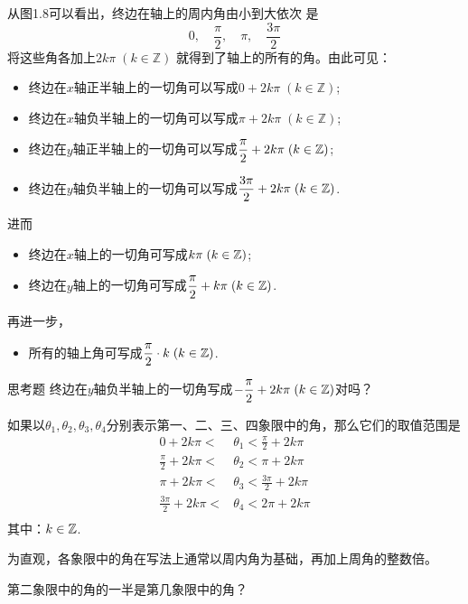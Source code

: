 从图1.8可以看出，终边在轴上的周内角由小到大依次
是
\[0,\quad  \frac{\pi}{2},\quad \pi,\quad \frac{3\pi}{2}\]
将这些角各加上$2k\pi\; (k\in\mathbb{Z})$ 就得到了轴上的所有的角。由此可见：
\begin{itemize}
    \item 终边在$x$轴正半轴上的一切角可以写成$0+2k\pi\; (k\in\mathbb{Z})$;
    \item 终边在$x$轴负半轴上的一切角可以写成$\pi+2k\pi\; (k\in\mathbb{Z})$;
    \item 终边在$y$轴正半轴上的一切角可以写成$\dfrac{\pi}{2}+2k\pi\; (k\in \mathbb{Z})$; 
    \item 终边在$y$轴负半轴上的一切角可以写成$\dfrac{3\pi}{2}+2k\pi\; (k\in \mathbb{Z})$.
\end{itemize}
进而
\begin{itemize}
    \item 终边在$x$轴上的一切角可写成$k\pi\; (k\in \mathbb{Z})$;
    \item 终边在$y$轴上的一切角可写成$\dfrac{\pi}{2}+k\pi\; (k\in \mathbb{Z})$.
\end{itemize}
再进一步，
\begin{itemize}
    \item 所有的轴上角可写成$\dfrac{\pi}{2}\cdot k\; (k\in \mathbb{Z})$.
\end{itemize}

\begin{thm}{思考题}
   终边在$y$轴负半轴上的一切角写成$-\dfrac{\pi}{2}+2k\pi\; (k\in\mathbb{Z})$对吗？ 
\end{thm}

如果以$\theta_1,\theta_2,\theta_3,\theta_4$分别表示第一、二、三、四象限中的角，那么它们的取值范围是
\[\begin{split}
    0+2k\pi<&\theta_1<\frac{\pi}{2}+2k\pi\\
    \frac{\pi}{2}+2k\pi<&\theta_2<\pi+2k\pi\\
    \pi+2k\pi<&\theta_3<\frac{3\pi}{2}+2k\pi\\
    \frac{3\pi}{2}+2k\pi<&\theta_4<2\pi+2k\pi\\
\end{split}\]
其中：$k\in\mathbb{Z}$.

\begin{note}
    为直观，各象限中的角在写法上通常以周内角为基础，再加上周角的整数倍。
\end{note}

\begin{example}
    第二象限中的角的一半是第几象限中的角？
\end{example}

